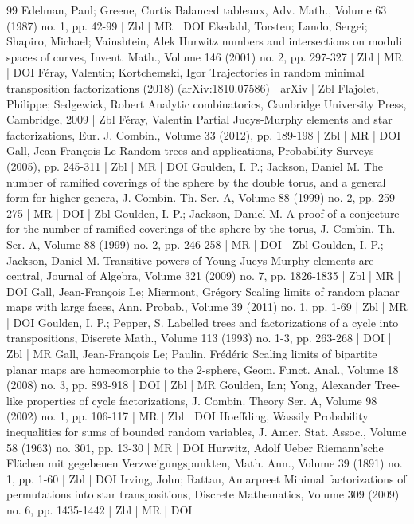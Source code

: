 \documentclass[10pt]{amsart}
\theoremstyle{definition}\newtheorem{defi}[theo]{Definition}\newtheorem{rema}[theo]{Remark}\newtheorem{exam}[theo]{Example}\newtheorem{exem}[theo]{Example}\newtheorem{nota}[theo]{Notation}
\begin{document}
\begin{thebibliography}{99}
Edelman, Paul; Greene, Curtis Balanced tableaux, Adv. Math., Volume 63 (1987) no. 1, pp. 42-99 | Zbl | MR | DOI
Ekedahl, Torsten; Lando, Sergei; Shapiro, Michael; Vainshtein, Alek Hurwitz numbers and intersections on moduli spaces of curves, Invent. Math., Volume 146 (2001) no. 2, pp. 297-327 | Zbl | MR | DOI
Féray, Valentin; Kortchemski, Igor Trajectories in random minimal transposition factorizations (2018) (arXiv:1810.07586) | arXiv | Zbl
Flajolet, Philippe; Sedgewick, Robert Analytic combinatorics, Cambridge University Press, Cambridge, 2009 | Zbl
Féray, Valentin Partial Jucys-Murphy elements and star factorizations, Eur. J. Combin., Volume 33 (2012), pp. 189-198 | Zbl | MR | DOI
Gall, Jean-François Le Random trees and applications, Probability Surveys (2005), pp. 245-311 | Zbl | MR | DOI
Goulden, I. P.; Jackson, Daniel M. The number of ramified coverings of the sphere by the double torus, and a general form for higher genera, J. Combin. Th. Ser. A, Volume 88 (1999) no. 2, pp. 259-275 | MR | DOI | Zbl
Goulden, I. P.; Jackson, Daniel M. A proof of a conjecture for the number of ramified coverings of the sphere by the torus, J. Combin. Th. Ser. A, Volume 88 (1999) no. 2, pp. 246-258 | MR | DOI | Zbl
Goulden, I. P.; Jackson, Daniel M. Transitive powers of Young-Jucys-Murphy elements are central, Journal of Algebra, Volume 321 (2009) no. 7, pp. 1826-1835 | Zbl | MR | DOI
Gall, Jean-François Le; Miermont, Grégory Scaling limits of random planar maps with large faces, Ann. Probab., Volume 39 (2011) no. 1, pp. 1-69 | Zbl | MR | DOI
Goulden, I. P.; Pepper, S. Labelled trees and factorizations of a cycle into transpositions, Discrete Math., Volume 113 (1993) no. 1-3, pp. 263-268 | DOI | Zbl | MR
Gall, Jean-François Le; Paulin, Frédéric Scaling limits of bipartite planar maps are homeomorphic to the 2-sphere, Geom. Funct. Anal., Volume 18 (2008) no. 3, pp. 893-918 | DOI | Zbl | MR
Goulden, Ian; Yong, Alexander Tree-like properties of cycle factorizations, J. Combin. Theory Ser. A, Volume 98 (2002) no. 1, pp. 106-117 | MR | Zbl | DOI
Hoeffding, Wassily Probability inequalities for sums of bounded random variables, J. Amer. Stat. Assoc., Volume 58 (1963) no. 301, pp. 13-30 | MR | DOI
Hurwitz, Adolf Ueber Riemann’sche Flächen mit gegebenen Verzweigungspunkten, Math. Ann., Volume 39 (1891) no. 1, pp. 1-60 | Zbl | DOI
Irving, John; Rattan, Amarpreet Minimal factorizations of permutations into star transpositions, Discrete Mathematics, Volume 309 (2009) no. 6, pp. 1435-1442 | Zbl | MR | DOI

\end{thebibliography}
\end{document}
